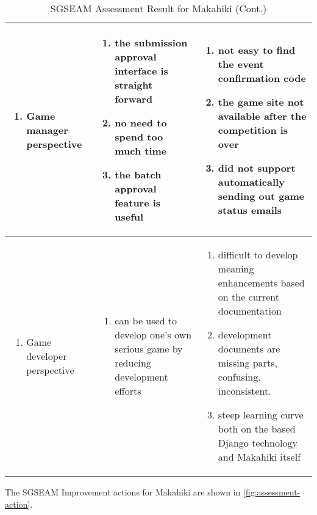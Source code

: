 \begin{table}[ht!]
\begin{tabular}{|P{0.17\columnwidth}|P{0.33\columnwidth}|P{0.4\columnwidth}|}
    \hline
    \begin{enumerate}[label={}, nosep, leftmargin=*]
    \item Game manager perspective 
    \end{enumerate}
    & 
    \begin{enumerate}[nosep, leftmargin=*]
    \item the submission approval interface is straight forward 
    \item no need to spend too much time 
    \item the batch approval feature is useful 
    \end{enumerate} 
    & 
    \begin{enumerate}[nosep, leftmargin=*]
    \item not easy to find the event confirmation code 
    \item the game site not available after the competition is over
    \item did not support automatically sending out game status emails 
    \end{enumerate}  \\
    \hline
    \begin{enumerate}[label={}, nosep, leftmargin=*]
    \item Game developer perspective
    \end{enumerate}
    & 
    \begin{enumerate}[label={}, nosep, leftmargin=*]
    \item can be used to develop one's own serious game by reducing development efforts 
    \end{enumerate} 
    & 
    \begin{enumerate}[nosep, leftmargin=*]
    \item difficult to develop meaning enhancements based on the current documentation
    \item development documents are missing parts, confusing, inconsistent.
    \item steep learning curve both on the based Django technology and Makahiki itself 
    \end{enumerate} \\
    \hline
  \end{tabular}
  \caption{SGSEAM Assessment Result for Makahiki (Cont.)}
  \label{table:assessment-result2}
\end{table}

\clearpage

The SGSEAM Improvement actions for Makahiki are shown in \autoref{fig:assessment-action}.

